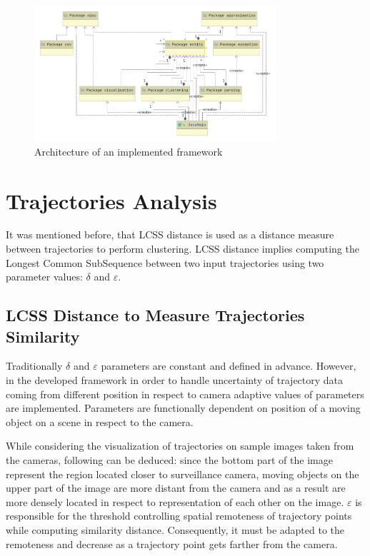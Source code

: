\begin{figure}[!htb]
	\centering{}
	\includegraphics[width=0.8\textwidth]{images/proj-arch.png}
	\caption{Architecture of an implemented framework}
	\label{fig:proj-arch}
\end{figure}

\section{Trajectories Analysis}

It was mentioned before, that LCSS distance is used as a distance measure between trajectories to perform clustering. LCSS distance implies computing the Longest Common SubSequence between two input trajectories using two parameter values: $\delta$ and $\varepsilon$. 

\subsection{LCSS Distance to Measure Trajectories Similarity}

Traditionally $\delta$ and $\varepsilon$ parameters are constant and defined in advance. However, in the developed framework in order to handle uncertainty of trajectory data coming from different position in respect to camera adaptive values of parameters are implemented. Parameters are functionally dependent on position of a moving object on a scene in respect to the camera. 

While considering the visualization of trajectories on sample images taken from the cameras, following can be deduced: since the bottom part of the image represent the region located closer to surveillance camera, moving objects on the upper part of the image are more distant from the camera and as a result are more densely located in respect to representation of each other on the image. $\varepsilon$ is responsible for the threshold controlling spatial remoteness of trajectory points while computing similarity distance. Consequently, it must be adapted to the remoteness and decrease as a trajectory point gets farther from the camera.

